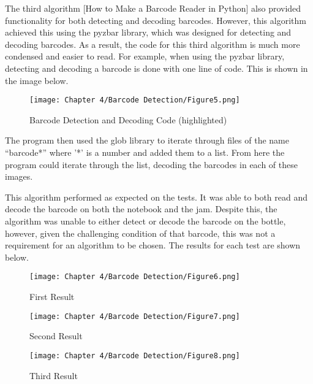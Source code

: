 The third algorithm [How to Make a Barcode Reader in Python] also provided functionality for both detecting and decoding barcodes.
However, this algorithm achieved this using the pyzbar library, which was designed for detecting and decoding barcodes.
As a result, the code for this third algorithm is much more condensed and easier to read.
For example, when using the pyzbar library, detecting and decoding a barcode is done with one line of code.
This is shown in the image below.

\begin{figure}[H]        
    \centering
    \texttt{[image: Chapter 4/Barcode Detection/Figure5.png]}
    \caption{Barcode Detection and Decoding Code (highlighted)}
    \label{fig:bc5} 
\end{figure} 

The program then used the glob library to iterate through files of the name “barcode*” where '*' is a number and added them to a list.
From here the program could iterate through the list, decoding the barcodes in each of these images.

This algorithm performed as expected on the tests.
It was able to both read and decode the barcode on both the notebook and the jam.
Despite this, the algorithm was unable to either detect or decode the barcode on the bottle, however, given the challenging condition of that barcode, this was not a requirement for an algorithm to be chosen.
The results for each test are shown below.

\begin{figure}[H]        
    \centering
    \texttt{[image: Chapter 4/Barcode Detection/Figure6.png]}
    \caption{First Result}
    \label{fig:bc6} 
\end{figure} 

\begin{figure}[H]        
    \centering
    \texttt{[image: Chapter 4/Barcode Detection/Figure7.png]}
    \caption{Second Result}
    \label{fig:bc7} 
\end{figure} 

\begin{figure}[H]        
    \centering
    \texttt{[image: Chapter 4/Barcode Detection/Figure8.png]}
    \caption{Third Result}
    \label{fig:bc8} 
\end{figure} 


